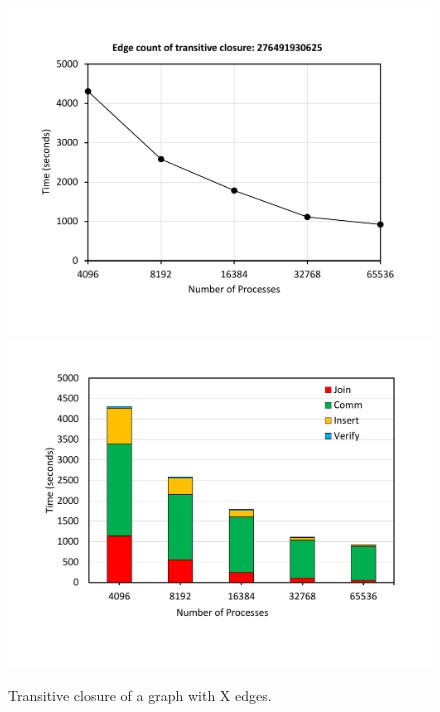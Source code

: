 \begin{figure}[t]
	{\includegraphics[width=.50\textwidth,  trim={0cm 0cm 0cm 0cm, 
			clip}]{results/TC_260Billion.pdf}}\hfill%
	{\includegraphics[width=.50\textwidth,  trim={0cm 0cm 0cm 0cm,
			clip}]{results/TC_260Billion_breakdown.pdf}}\hfill%
	\centering
	\caption{Transitive closure of a graph with X edges.}
	\label{fig:tc_large}
\end{figure}